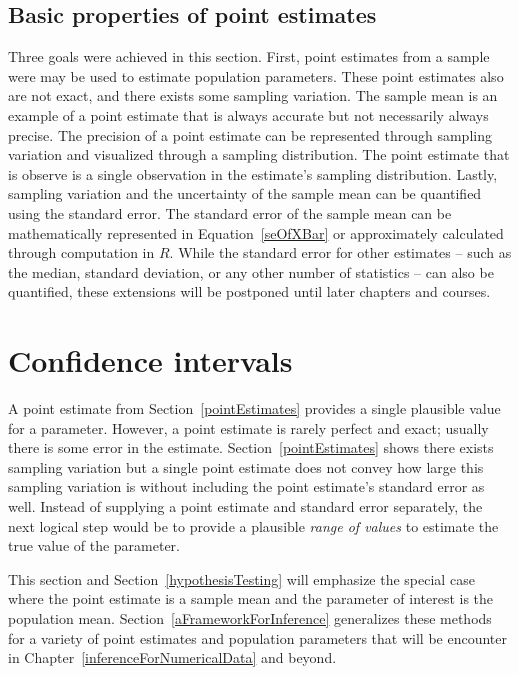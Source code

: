 \subsection{Basic properties of point estimates}

Three goals were achieved in this section. First, point estimates from a sample were may be used to estimate population parameters. These point estimates also are not exact, and there exists some sampling variation. The sample mean is an example of a point estimate that is always accurate but not necessarily always precise. The precision of a point estimate can be represented through sampling variation and visualized through a sampling distribution. The point estimate that is observe is a single observation in the estimate's sampling distribution. Lastly, sampling variation and the uncertainty of the sample mean can be quantified using the standard error. The standard error of the sample mean can be mathematically represented in Equation~\eqref{seOfXBar} or approximately calculated through computation in $R$. While the standard error for other estimates -- such as the median, standard deviation, or any other number of statistics -- can also be quantified, these extensions will be postponed until later chapters and courses.


\section{Confidence intervals}
\label{confidenceIntervals}


A point estimate from Section~\ref{pointEstimates} provides a single plausible value for a parameter. However, a point estimate is rarely perfect and exact; usually there is some error in the estimate. Section~\ref{pointEstimates} shows there exists sampling variation but a single point estimate does not convey how large this sampling variation is without including the point estimate's standard error as well. Instead of supplying a point estimate and standard error separately, the next logical step would be to provide a plausible \emph{range of values} to estimate the true value of the parameter.

This section and Section~\ref{hypothesisTesting} will emphasize the special case where the point estimate is a sample mean and the parameter of interest is the population mean. Section~\ref{aFrameworkForInference} generalizes these methods for a variety of point estimates and population parameters that will be encounter in Chapter~\ref{inferenceForNumericalData} and beyond.

